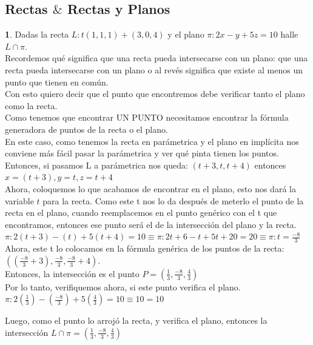 \documentclass[10pt,a4paper]{article}
\begin{document}
\subsection*{Rectas $\&$ Rectas y Planos}
\label{subsec:ejercicios_rectas_planos}
\textbf{1}. Dadas la recta $L:t(1, 1, 1) + (3, 0, 4)$ y el plano $\pi:2x-y+5z=10$ halle $L \cap \pi$. \\
Recordemos qué significa que una recta pueda intersecarse con un plano: que una recta pueda intersecarse con un plano o al revés significa que existe al menos un punto que tienen en común. \\
Con esto quiero decir que el punto que encontremos debe verificar tanto el plano como la recta. \\
Como tenemos que encontrar UN PUNTO necesitamos encontrar la fórmula generadora de puntos de la recta o el plano. \\
En este caso, como tenemos la recta en parámetrica y el plano en implícita nos conviene más fácil pasar la parámetrica y ver qué pinta tienen los puntos. \\
Entonces, si pasamos L a parámetrica nos queda: $(t+3, t, t+4)$ entonces $x=(t+3), y=t, z=t+4$ \\
Ahora, coloquemos lo que acabamos de encontrar en el plano, esto nos dará la variable $t$ para la recta. Como este t nos lo da después de meterlo el punto de la recta en el plano, cuando reemplacemos en el punto genérico con el t que encontramos, entonces ese punto será el de la intersección del plano y la recta.  \\
$\pi:2(t+3)-(t)+5(t+4)=10 \equiv \pi:2t+6-t+5t+20=20 \equiv \pi:t=\frac{-8}{3}$ \\
Ahora, este t lo colocamos en la fórmula genérica de los puntos de la recta: $((\frac{-8}{3}+3), \frac{-8}{3}, \frac{-8}{3}+4)$. \\
Entonces, la intersección es el punto $P=(\frac{1}{3}, \frac{-8}{3}, \frac{4}{3})$ \\
Por lo tanto, verifiquemos ahora, si este punto verifica el plano. \\
$\pi:2(\frac{1}{3}) - (\frac{-8}{3}) + 5(\frac{4}{3}) = 10 \equiv 10 = 10$

Luego, como el punto lo arrojó la recta, y verifica el plano, entonces la intersección $ L \cap \pi = (\frac{1}{3}, \frac{-8}{3}, \frac{4}{3})$ \\
\end{document}
